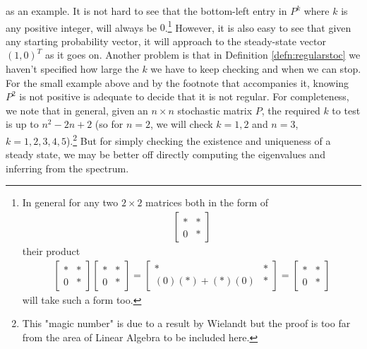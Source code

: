 as an example. It is not hard to see that the bottom-left entry in $P^k$ where $k$ is any positive integer, will always be $0$.\footnote{In general for any two $2 \times 2$ matrices both in the form of
\begin{align*}
\begin{bmatrix}
* & * \\
0 & *    
\end{bmatrix}
\end{align*} their product
\begin{align*}
\begin{bmatrix}
* & * \\
0 & *    
\end{bmatrix}
\begin{bmatrix}
* & * \\
0 & *    
\end{bmatrix}
=
\begin{bmatrix}
* & * \\
(0)(*) + (*)(0) & *    
\end{bmatrix}
=
\begin{bmatrix}
* & * \\
0 & *    
\end{bmatrix}
\end{align*} will take such a form too.} However, it is also easy to see that given any starting probability vector, it will approach to the steady-state vector $(1,0)^T$ as it goes on. Another problem is that in Definition \ref{defn:regularstoc} we haven't specified how large the $k$ we have to keep checking and when we can stop. For the small example above and by the footnote that accompanies it, knowing $P^2$ is not positive is adequate to decide that it is not regular. For completeness, we note that in general, given an $n \times n$ stochastic matrix $P$, the required $k$ to test is up to $n^2 - 2n + 2$ (so for $n = 2$, we will check $k = 1,2$ and $n = 3$, $k = 1,2,3,4,5$).\footnote{This "magic number" is due to a result by Wielandt but the proof is too far from the area of Linear Algebra to be included here.} But for simply checking the existence and uniqueness of a steady state, we may be better off directly computing the eigenvalues and inferring from the spectrum.

